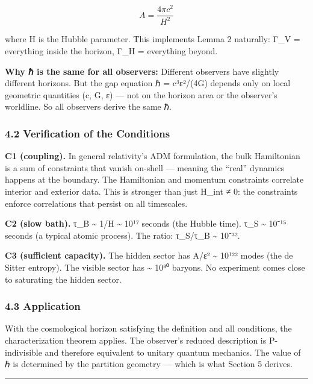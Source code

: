 \documentclass[
]{article}
\begin{document}
\[A = \frac{4\pi c^2}{H^2}\]

where H is the Hubble parameter. This implements Lemma 2 naturally: Γ\_V
= everything inside the horizon, Γ\_H = everything beyond.

\textbf{Why ℏ is the same for all observers:} Different observers have
slightly different horizons. But the gap equation ℏ = c³ε²/(4G) depends
only on local geometric quantities (c, G, ε) --- not on the horizon area
or the observer's worldline. So all observers derive the same ℏ.

\hypertarget{verification-of-the-conditions}{%
\subsubsection{4.2 Verification of the
Conditions}\label{verification-of-the-conditions}}

\textbf{C1 (coupling).} In general relativity's ADM formulation, the
bulk Hamiltonian is a sum of constraints that vanish on-shell ---
meaning the ``real'' dynamics happens at the boundary. The Hamiltonian
and momentum constraints correlate interior and exterior data. This is
stronger than just H\_int ≠ 0: the constraints enforce correlations that
persist on all timescales.

\textbf{C2 (slow bath).} τ\_B \textasciitilde{} 1/H \textasciitilde{}
10¹⁷ seconds (the Hubble time). τ\_S \textasciitilde{} 10⁻¹⁵ seconds (a
typical atomic process). The ratio: τ\_S/τ\_B \textasciitilde{} 10⁻³².

\textbf{C3 (sufficient capacity).} The hidden sector has A/ε²
\textasciitilde{} 10¹²² modes (the de Sitter entropy). The visible
sector has \textasciitilde{} 10⁸⁰ baryons. No experiment comes close to
saturating the hidden sector.

\hypertarget{application}{%
\subsubsection{4.3 Application}\label{application}}

With the cosmological horizon satisfying the definition and all
conditions, the characterization theorem applies. The observer's reduced
description is P-indivisible and therefore equivalent to unitary quantum
mechanics. The value of ℏ is determined by the partition geometry ---
which is what Section 5 derives.

\begin{center}\rule{0.5\linewidth}{0.5pt}\end{center}
\end{document}
